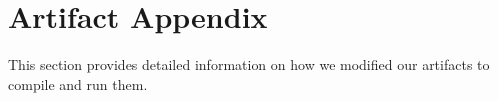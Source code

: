 \section{Artifact Appendix}\label{s:appendix}

This section provides detailed information on how we modified our artifacts to compile and run them.







